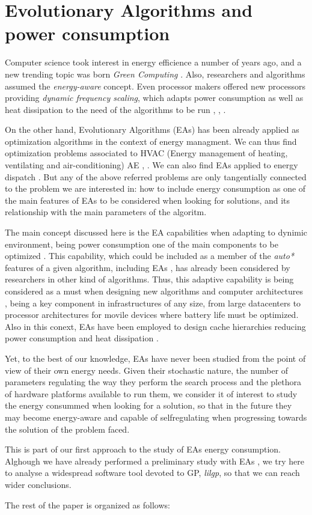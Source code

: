 \section{Evolutionary Algorithms and power consumption}

Computer science took interest in energy efficience a number of years ago, and a new trending topic was born \textit{Green Computing} \cite{green-computing}.  Also, researchers and algorithms assumed the \textit{energy-aware} \cite{energy-aware} concept.  Even processor makers offered new processors providing \textit{dynamic frequency scaling}, which adapts power consumption as well as heat dissipation to the need of the algorithms to be run \cite{scaling}, \cite{dynamic-scaling}, \cite{energy-efficient}.

On the other hand, Evolutionary Algorithms (EAs) has been already applied as optimization algorithms in the context of energy managment.  We can thus find optimization problems associated to HVAC (Energy management of heating, ventilating and air-conditioning) AE \cite{HVAC}, \cite{chiller}.  We can also find EAs applied to energy dispatch \cite{dispatch}.  But any of the above referred problems are only tangentially connected to the problem we are interested in:  how to include energy consumption as one of the main features of EAs to be considered when looking for solutions, and its relationship with the main parameters of the algoritm.

The main concept discussed here is the EA capabilities when adapting to dynimic environment, being power consumption one of the main components to be optimized \cite{ephemeral}. This capability, which could be included as a member of the \textit{auto*} features of a given algorithm, including EAs \cite{self}, has already been considered by researchers in other kind of algorithms.  Thus, this adaptive capability is being considered as a must when designing new algorithms and computer architectures \cite{energy-aware}, being a key component in infrastructures of any size, from large datacenters to processor architectures for movile devices where battery life must be optimized.  Also in this conext, EAs have been employed to design cache hierarchies reducing power consumption and heat dissipation \cite{cache}.

Yet, to the best of our knowledge, EAs have never been studied from the point of view of their own energy needs.  Given their stochastic nature, the number of parameters regulating the way they perform the search process and the plethora of hardware platforms available to run them, we consider it of interest to study the energy consummed when looking for a solution, so that in the future they may become energy-aware and capable of selfregulating when progressing towards the solution of the problem faced.

This is part of our first approach to the study of EAs energy consumption.  Alghough we have already performed a preliminary study with EAs \cite{MAEB}, we try here to analyse a widespread software tool devoted to GP, \textit{lilgp}, so that we can reach wider conclusions.

The rest of the paper is organized as follows:  
